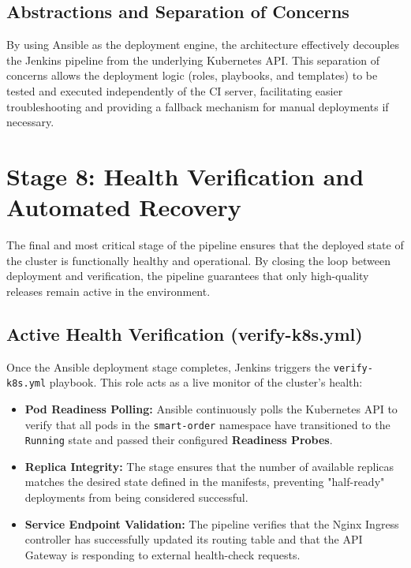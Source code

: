 \documentclass[12pt,a4paper]{report}
\begin{document}
\subsection{Abstractions and Separation of Concerns}
By using Ansible as the deployment engine, the architecture effectively decouples the Jenkins pipeline from the underlying Kubernetes API. This separation of concerns allows the deployment logic (roles, playbooks, and templates) to be tested and executed independently of the CI server, facilitating easier troubleshooting and providing a fallback mechanism for manual deployments if necessary.

\section{Stage 8: Health Verification and Automated Recovery}
The final and most critical stage of the pipeline ensures that the deployed state of the cluster is functionally healthy and operational. By closing the loop between deployment and verification, the pipeline guarantees that only high-quality releases remain active in the environment.

\subsection{Active Health Verification (verify-k8s.yml)}
Once the Ansible deployment stage completes, Jenkins triggers the \texttt{verify-k8s.yml} playbook. This role acts as a live monitor of the cluster's health:
\begin{itemize}
    \item \textbf{Pod Readiness Polling:} Ansible continuously polls the Kubernetes API to verify that all pods in the \texttt{smart-order} namespace have transitioned to the \texttt{Running} state and passed their configured \textbf{Readiness Probes}.
    \item \textbf{Replica Integrity:} The stage ensures that the number of available replicas matches the desired state defined in the manifests, preventing "half-ready" deployments from being considered successful.
    \item \textbf{Service Endpoint Validation:} The pipeline verifies that the Nginx Ingress controller has successfully updated its routing table and that the API Gateway is responding to external health-check requests.
\end{itemize}
\end{document}
